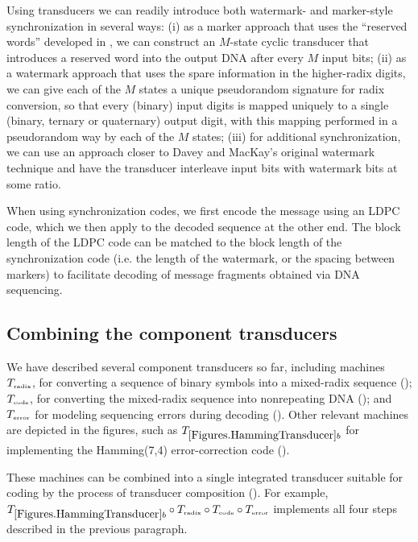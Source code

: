 \documentclass[english]{article}
\begin{document}
Using transducers we can readily introduce both watermark- and marker-style synchronization in several ways:
(i) as a marker approach that uses the ``reserved words'' developed in ,
we can construct an $M$-state cyclic transducer that introduces a reserved word into the output DNA after every $M$ input bits;
(ii) as a watermark approach that uses the spare information in the higher-radix digits, we can give each of the $M$ states a unique pseudorandom signature for radix conversion,
so that every (binary) input digits is mapped uniquely to a single (binary, ternary or quaternary) output digit,
with this mapping performed in a pseudorandom way by each of the $M$ states;
(iii) for additional synchronization, we can use an approach closer to Davey and MacKay's original watermark technique
and have the transducer interleave input bits with watermark bits at some ratio.

When using synchronization codes, we first encode the message using an LDPC code,
which we then apply to the decoded sequence at the other end.
The block length of the LDPC code can be matched to the block length of the synchronization code
(i.e. the length of the watermark, or the spacing between markers)
to facilitate decoding of message fragments obtained via DNA sequencing.

\subsection{Combining the component transducers}

We have described several component transducers so far,
including machines
$T_{\mbox{\tiny radix}}$, for converting a sequence of binary symbols
into a mixed-radix sequence ();
$T_{\mbox{\tiny code}}$, for converting the mixed-radix sequence into nonrepeating DNA
();
and $T_{\mbox{\tiny error}}$ for modeling sequencing errors during decoding
().
Other relevant machines are depicted in the figures,
such as $\hammingsevenfour$ for implementing the Hamming(7,4) error-correction code
().

These machines can be combined into a single integrated transducer suitable for coding
by the process of transducer composition ().
For example, $\hammingsevenfour \transcomp \transrad \transcomp \transcoder \transcomp \transerror$
implements all four steps described in the previous paragraph.
\end{document}
